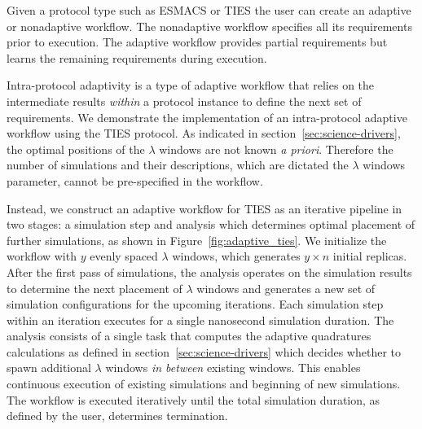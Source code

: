 
Given a protocol type such as ESMACS or TIES the user can create an adaptive
or nonadaptive workflow. The nonadaptive workflow specifies all its
requirements prior to execution. The adaptive workflow provides partial
requirements but learns the remaining requirements during execution.

Intra-protocol adaptivity is a type of adaptive workflow that relies on the
intermediate results \textit{within} a protocol instance to define the next
set of requirements. We demonstrate the implementation of an intra-protocol
adaptive workflow using the TIES protocol. As indicated in
section~\ref{sec:science-drivers}, the optimal positions of the $\lambda$ windows
are not known \textit{a priori}. Therefore the number of simulations and
their descriptions, which are dictated the $\lambda$ windows parameter,
cannot be pre-specified in the workflow.

Instead, we construct an adaptive workflow for TIES as an iterative pipeline
in two stages: a simulation step and analysis which determines optimal
placement of further simulations, as shown in Figure~\ref{fig:adaptive_ties}.
We initialize the workflow with $y$ evenly spaced $\lambda$ windows, which
generates $y \times n$ initial replicas. After the first pass of simulations,
the analysis operates on the simulation results to determine the next
placement of $\lambda$ windows and generates a new set of simulation
configurations for the upcoming iterations. Each simulation step within an
iteration executes for a single nanosecond simulation duration. The analysis
consists of a single task that computes the adaptive quadratures calculations
as defined in section~\ref{sec:science-drivers} which decides whether to
spawn additional $\lambda$ windows \textit{in between} existing windows. This
enables continuous execution of existing simulations and beginning of new
simulations. The workflow is executed iteratively until the total simulation
duration, as defined by the user, determines termination.

